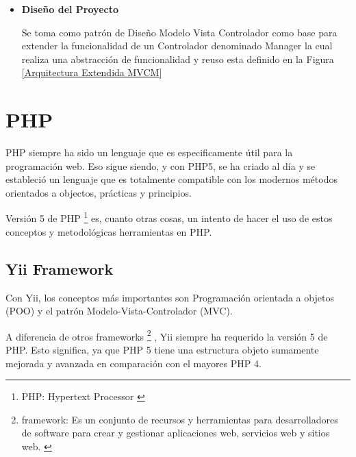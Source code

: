 \begin{itemize}

\item \textbf{Dise\~{n}o del Proyecto}

Se toma como patr\'{o}n de Dise\~{n}o Modelo Vista Controlador como base para 
extender la funcionalidad de un Controlador denominado Manager la cual realiza
una abstracci\'{o}n de funcionalidad y reuso esta definido en la Figura 
\ref{Arquitectura Extendida MVCM}

\begin{minipage}{1.0\textwidth}
	\centering
	\label{Arquitectura Extendida MVCM}
\end{minipage}


\end{itemize}

\section{PHP}

PHP siempre ha sido un lenguaje que es especificamente \'{u}til para la 
programaci\'{o}n web. Eso sigue siendo, y con PHP5, se ha criado al d\'{i}a y
se estableci\'{o} un lenguaje que es totalmente compatible con los modernos 
m\'{e}todos orientados a objectos, pr\'{a}cticas y principios. 

Versi\'{o}n 5 de PHP \footnote{PHP: Hypertext Processor \cite{reiersol2007php}} 
es, cuanto otras cosas, un intento de hacer el uso de estos conceptos y 
metodol\'{o}gicas herramientas en PHP.\cite{reiersol2007php}

\subsection{Yii Framework}

Con Yii, los conceptos m\'{a}s importantes son Programaci\'{o}n orientada a objetos
(POO) y el patr\'{o}n Modelo-Vista-Controlador (MVC).

A diferencia de otros frameworks \footnote{framework: Es un conjunto de recursos
y herramientas para desarrolladores de software para crear y gestionar 
aplicaciones web, servicios web y sitios web. \cite{framework}} , Yii siempre ha
requerido la versi\'{o}n 5 de PHP. Esto significa, ya que PHP 5 tiene una 
estructura objeto sumamente mejorada y avanzada en comparaci\'{o}n con el 
mayores PHP 4. \cite{ullman2013yii}

